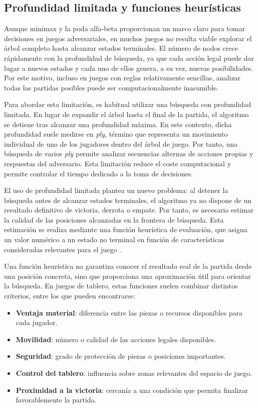 \subsection{Profundidad limitada y funciones heurísticas}

Aunque minimax y la poda alfa-beta proporcionan un marco claro para tomar decisiones en juegos adversariales, en muchos juegos no resulta viable explorar el árbol completo hasta alcanzar estados terminales. El número de nodos crece rápidamente con la profundidad de búsqueda, ya que cada acción legal puede dar lugar a nuevos estados y cada uno de ellos genera, a su vez, nuevas posibilidades. Por este motivo, incluso en juegos con reglas relativamente sencillas, analizar todas las partidas posibles puede ser computacionalmente inasumible.

Para abordar esta limitación, es habitual utilizar una búsqueda con profundidad limitada. En lugar de expandir el árbol hasta el final de la partida, el algoritmo se detiene tras alcanzar una profundidad máxima. En este contexto, dicha profundidad suele medirse en \emph{ply}, término que representa un movimiento individual de uno de los jugadores dentro del árbol de juego. Por tanto, una búsqueda de varios \emph{ply} permite analizar secuencias alternas de acciones propias y respuestas del adversario. Esta limitación reduce el coste computacional y permite controlar el tiempo dedicado a la toma de decisiones.

El uso de profundidad limitada plantea un nuevo problema: al detener la búsqueda antes de alcanzar estados terminales, el algoritmo ya no dispone de un resultado definitivo de victoria, derrota o empate. Por tanto, es necesario estimar la calidad de las posiciones alcanzadas en la frontera de búsqueda. Esta estimación se realiza mediante una función heurística de evaluación, que asigna un valor numérico a un estado no terminal en función de características consideradas relevantes para el juego~\cite{russell2020aima,poole2023foundations}.

Una función heurística no garantiza conocer el resultado real de la partida desde una posición concreta, sino que proporciona una aproximación útil para orientar la búsqueda. En juegos de tablero, estas funciones suelen combinar distintos criterios, entre los que pueden encontrarse:

\begin{itemize}
    \item \textbf{Ventaja material}: diferencia entre las piezas o recursos disponibles para cada jugador.
    \item \textbf{Movilidad}: número o calidad de las acciones legales disponibles.
    \item \textbf{Seguridad}: grado de protección de piezas o posiciones importantes.
    \item \textbf{Control del tablero}: influencia sobre zonas relevantes del espacio de juego.
    \item \textbf{Proximidad a la victoria}: cercanía a una condición que permita finalizar favorablemente la partida.
\end{itemize}

